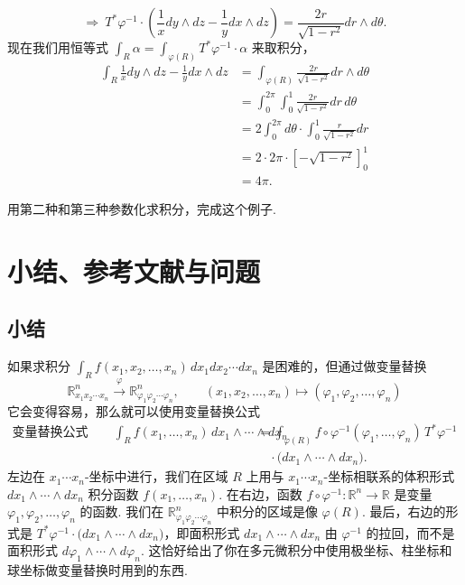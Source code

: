 \[
\Rightarrow\ T^*\varphi^{-1}\cdot\left(\frac{1}{x}dy\wedge dz-\frac{1}{y}dx\wedge dz\right)=\frac{2r}{\sqrt{1-r^2}}dr\wedge d\theta.
\]
现在我们用恒等式 $\int_R\alpha=\int_{\varphi(R)}T^*\varphi^{-1}\cdot\alpha$ 来取积分，
\begin{align*}
\int_R\frac{1}{x}dy\wedge dz-\frac{1}{y}dx\wedge dz
&=\int_{\varphi(R)}\frac{2r}{\sqrt{1-r^2}}dr\wedge d\theta\\
&=\int_0^{2\pi}\int_0^1\frac{2r}{\sqrt{1-r^2}}dr\,d\theta\\
&=2\int_0^{2\pi}d\theta\cdot\int_0^1\frac{r}{\sqrt{1-r^2}}dr\\
&=2\cdot 2\pi\cdot\left[-\sqrt{1-r^2}\right]_0^1\\
&=4\pi.
\end{align*}

\begin{question}\label{q:7-13}
用第二种和第三种参数化求积分，完成这个例子.
\end{question}

\section{小结、参考文献与问题}

\subsection{小结}

如果求积分 $\int_R f(x_1,x_2,\ldots,x_n)\,dx_1dx_2\cdots dx_n$ 是困难的，但通过做变量替换
\[
\mathbb{R}^n_{x_1x_2\cdots x_n}\xrightarrow{\ \varphi\ }\mathbb{R}^n_{\varphi_1\varphi_2\cdots\varphi_n},\qquad(x_1,x_2,\ldots,x_n)\longmapsto(\varphi_1,\varphi_2,\ldots,\varphi_n)
\]
它会变得容易，那么就可以使用变量替换公式
\[
\begin{aligned}
\text{变量替换公式}\qquad \int_R f(x_1,\ldots,x_n)\,dx_1\wedge\cdots\wedge dx_n
&=\int_{\varphi(R)}f\circ\varphi^{-1}(\varphi_1,\ldots,\varphi_n)\,T^*\varphi^{-1}\\
&\quad\cdot\bigl(dx_1\wedge\cdots\wedge dx_n\bigr).
\end{aligned}
\]
左边在 $x_1\cdots x_n$-坐标中进行，我们在区域 $R$ 上用与 $x_1\cdots x_n$-坐标相联系的体积形式 $dx_1\wedge\cdots\wedge dx_n$ 积分函数 $f(x_1,\ldots,x_n)$. 在右边，函数 $f\circ\varphi^{-1}:\mathbb{R}^n\to\mathbb{R}$ 是变量 $\varphi_1,\varphi_2,\ldots,\varphi_n$ 的函数. 我们在 $\mathbb{R}^n_{\varphi_1\varphi_2\cdots\varphi_n}$ 中积分的区域是像 $\varphi(R)$. 最后，右边的形式是 $T^*\varphi^{-1}\cdot\bigl(dx_1\wedge\cdots\wedge dx_n\bigr)$，即面积形式 $dx_1\wedge\cdots\wedge dx_n$ 由 $\varphi^{-1}$ 的拉回，而不是面积形式 $d\varphi_1\wedge\cdots\wedge d\varphi_n$. 这恰好给出了你在多元微积分中使用极坐标、柱坐标和球坐标做变量替换时用到的东西.

